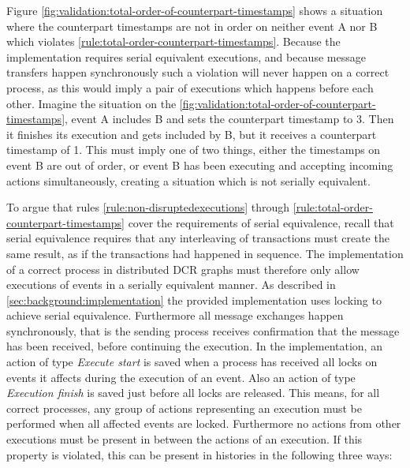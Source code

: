	\newpar Figure \ref{fig:validation:total-order-of-counterpart-timestamps} shows a situation where the counterpart timestamps are not in order on neither event A nor B which violates \autoref{rule:total-order-counterpart-timestamps}. Because the implementation requires serial equivalent executions, and because message transfers happen synchronously such a violation will never happen on a correct process, as this would imply a pair of executions which happens before each other. Imagine the situation on the \autoref{fig:validation:total-order-of-counterpart-timestamps}, event A includes B and sets the counterpart timestamp to 3. Then it finishes its execution and gets included by B, but it receives a counterpart timestamp of 1. This must imply one of two things, either the timestamps on event B are out of order, or event B has been executing and accepting incoming actions simultaneously, creating a situation which is not serially equivalent. 
	
	\newpar To argue that rules \ref{rule:non-disruptedexecutions} through \ref{rule:total-order-counterpart-timestamps} cover the requirements of serial equivalence, recall that serial equivalence requires that any interleaving of transactions must create the same result, as if the transactions had happened in sequence. The implementation of a correct process in distributed DCR graphs must therefore only allow executions of events in a serially equivalent manner. As described in \autoref{sec:background:implementation} the provided implementation uses locking to achieve serial equivalence. Furthermore all message exchanges happen synchronously, that is the sending process receives confirmation that the message has been received, before continuing the execution. In the implementation, an action of type \textit{Execute start} is saved when a process has received all locks on events it affects during the execution of an event. Also an action of type \textit{Execution finish} is saved just before all locks are released. This means, for all correct processes, any group of actions representing an execution must be performed when all affected events are locked. Furthermore no actions from other executions must be present in between the actions of an execution. If this property is violated, this can be present in histories in the following three ways:
	
